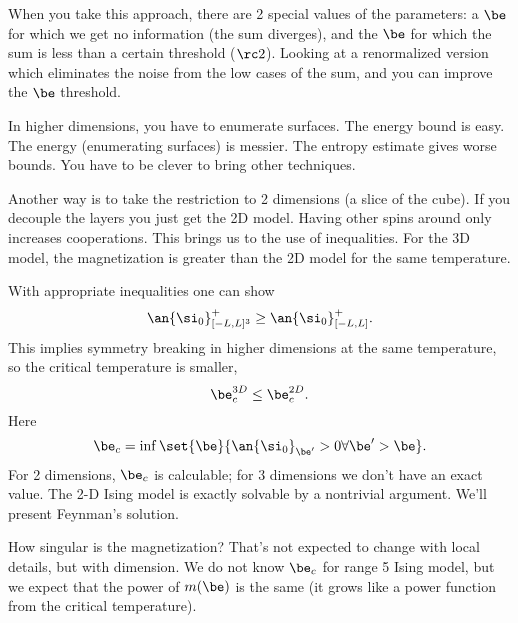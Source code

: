 When you take this approach, there are 2 special values of the parameters: a $\be$ for which we get no information (the sum diverges), and the $\be$ for which the sum is less than a certain threshold ($\rc2$). Looking at a renormalized version which eliminates the noise from the low cases of the sum, and you can improve the $\be$ threshold.

In higher dimensions, you have to enumerate surfaces. The energy bound is easy. The energy (enumerating surfaces) is messier. The entropy estimate gives worse bounds. You have to be clever to bring other techniques.

Another way is to take the restriction to 2 dimensions (a slice of the cube). If you decouple the layers you just get the 2D model. Having other spins around only increases cooperations. 
This brings us to the use of inequalities. For the 3D model, the magnetization is greater than the 2D model for the same temperature. 

With appropriate inequalities one can show
\[
\an{\si_0}_{[-L,L]^3}^+\ge \an{\si_0}_{[-L,L]}^+.
\]
This implies symmetry breaking in higher dimensions at the same temperature, so the critical temperature is smaller,
\[
\be_{c}^{3D} \le \be_c^{2D}.
\]
Here
\[
\be_c = \inf \set{\be}{\an{\si_0}_{\be'}>0 \forall \be'>\be}.
\]
For 2 dimensions, $\be_c$ is calculable; for 3 dimensions we don't have an exact value. The 2-D Ising model is exactly solvable by a nontrivial argument. We'll present Feynman's solution.

How singular is the magnetization? That's not expected to change with local details, but with dimension. We do not know $\be_c$ for range 5 Ising model, but we expect that the power of $m(\be)$ is the same (it grows like a power function from the critical temperature).